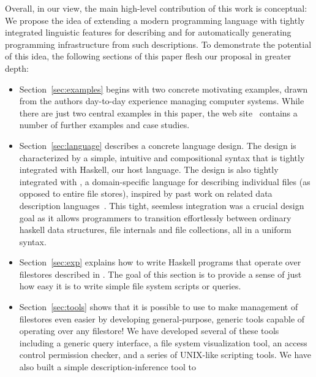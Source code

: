 Overall, in our view, the main high-level contribution of this work is
conceptual: We propose the idea of extending a modern programming
language with tightly integrated linguistic features for
describing \filestores{} and for automatically generating programming
infrastructure from such descriptions.  To demonstrate
the potential of this idea, the following sections of this paper
flesh our proposal in greater depth:

\begin{itemize}
\item Section~\ref{sec:examples} begins with two concrete motivating 
examples, drawn from the authors day-to-day experience managing
computer systems.  While there are just two central examples in this
paper, the \forest{} web site~\cite{forest-web-site} contains a number 
of further examples and case studies.~
\item Section~\ref{sec:language} describes a concrete language design.  
The design is characterized by a simple, 
intuitive and compositional syntax that is tightly integrated with
Haskell, our host language.  The design is also tightly integrated
with \padshaskell{}, a domain-specific language for describing 
individual
files (as opposed to entire file stores), inspired by past work
on related data description languages~\cite{fisher+:pads,fisher+:popl06,mandelbaum+:pads-ml,fisher+:toplas}.
This tight, seemless integration was a crucial design goal as it
allows programmers to transition effortlessly
between ordinary haskell data structures, file internals and 
file collections, all in a uniform syntax.
~
\item Section~\ref{sec:exp} explains how to write Haskell programs
that operate over filestores described in \forest.  The goal of this
section is to provide a sense of just how easy it is to write simple
file system scripts or queries.
\item Section~\ref{sec:tools} shows that it is possible to use \forest{}
to make management
of filestores even easier by developing general-purpose, generic
tools capable of operating over any filestore!  We have developed
several of these tools including a generic query interface, a file
system visualization tool, an access control permission checker, and a 
series of UNIX-like scripting tools.  We have also built a simple
description-inference tool to

\end{itemize}
